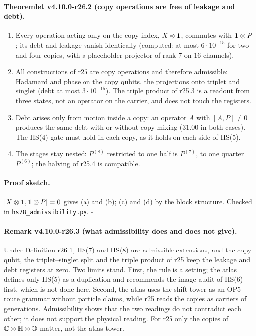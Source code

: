 \paragraph{Theoremlet v4.10.0-r26.2 (copy operations are free of leakage and debt).}
\begin{enumerate}[leftmargin=2em]
\item[(a)] Every operation acting only on the copy index, \(X\otimes\mathbf 1\), commutes with \(\mathbf 1\otimes P\); its debt and leakage vanish identically
(computed: at most \(6\cdot10^{-15}\) for two and four copies, with a placeholder projector of rank \(7\) on \(16\) channels).
\item[(b)] All constructions of r25 are copy operations and therefore admissible: Hadamard and phase on the copy qubits, the projections onto
triplet and singlet (debt at most \(3\cdot10^{-15}\)).  The triple product of r25.3 is a readout from three states, not an operator on the
carrier, and does not touch the registers.
\item[(c)] Debt arises only from motion inside a copy: an operator \(A\) with \([A,P]\ne0\) produces the same debt with or without copy mixing
(\(31.00\) in both cases).  The HS(4) gate must hold in each copy, as it holds on each side of HS(5).
\item[(d)] The stages stay nested: \(P^{(8)}\) restricted to one half is \(P^{(7)}\), to one quarter \(P^{(6)}\); the halving of r25.4 is compatible.
\end{enumerate}

\paragraph{Proof sketch.}
\([X\otimes\mathbf 1,\mathbf 1\otimes P]=0\) gives (a) and (b); (c) and (d) by the block structure.  Checked in \texttt{hs78\_\allowbreak admissibility.py}.  \(\square\)

\paragraph{Remark v4.10.0-r26.3 (what admissibility does and does not give).}
Under Definition r26.1, HS(7) and HS(8) are admissible extensions, and the copy qubit, the triplet--singlet split and the triple product of
r25 keep the leakage and debt registers at zero.  Two limits stand.  First, the rule is a setting; the atlas defines only HS(5) as a
duplication and recommends the image audit of HS(6) first, which is not done here.  Second, the atlas uses the shift tower as an OP5 route
grammar without particle claims, while r25 reads the copies as carriers of generations.  Admissibility shows that the two readings do not
contradict each other; it does not support the physical reading.  For r25 only the copies of \(\mathbb C\otimes\mathbb H\otimes\mathbb O\) matter, not the
atlas tower.

